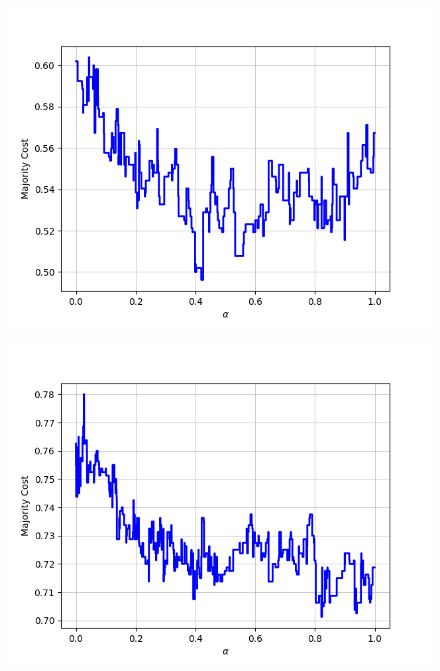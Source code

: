 \begin{figure}[H]
\begin{minipage}{.24\textwidth}
  {\includegraphics[width=\linewidth]{plots/omniglot-intra-ac-cnn/Korean}}
\end{minipage}
\begin{minipage}{.24\textwidth}
  \centering
  {\includegraphics[width=\linewidth]{plots/omniglot-intra-ac-cnn/Latin}}
\end{minipage}
\begin{minipage}{.24\textwidth}
  \centering

\end{minipage}
\end{figure}

